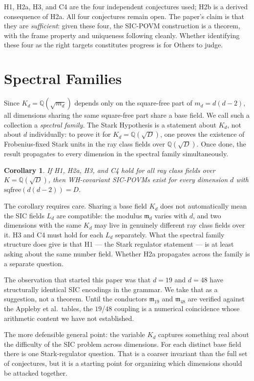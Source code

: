 \documentclass[12pt]{article}
\theoremstyle{plain}
\newtheorem{corollaryinner}[theoreminner]{Corollary}
\theoremstyle{definition}
\theoremstyle{remark}
\newenvironment{corollary}{\begin{mdframed}[style=thmstyle]\begin{corollaryinner}}{\end{corollaryinner}\end{mdframed}}
\newcommand{\bQ}{\mathbb{Q}}
\begin{document}
H1, H2a, H3, and C4 are the four independent conjectures used; H2b is a derived consequence of H2a. All four conjectures remain open. The paper's claim is that they are \emph{sufficient}: given these four, the SIC-POVM construction is a theorem, with the frame property and uniqueness following cleanly. Whether identifying these four as the right targets constitutes progress is for Others to judge.

\section{Spectral Families}
\label{sec:families}

Since $K_d = \bQ(\sqrt{m_d})$ depends only on the square-free part of $m_d = d(d-2)$, all dimensions sharing the same square-free part share a base field. We call such a collection a \emph{spectral family}. The Stark Hypothesis is a statement about $K_d$, not about $d$ individually: to prove it for $K_d = \bQ(\sqrt{D})$, one proves the existence of Frobenius-fixed Stark units in the ray class fields over $\bQ(\sqrt{D})$. Once done, the result propagates to every dimension in the spectral family simultaneously.

\begin{corollary}
  \label{cor:spectral}
  If H1, H2a, H3, and C4 hold for all ray class fields over $K = \bQ(\sqrt{D})$, then WH-covariant SIC-POVMs exist for every dimension $d$ with $\mathrm{sqfree}(d(d-2)) = D$.
\end{corollary}

The corollary requires care. Sharing a base field $K_d$ does not automatically mean the SIC fields $L_d$ are compatible: the modulus $\mathfrak{m}_d$ varies with $d$, and two dimensions with the same $K_d$ may live in genuinely different ray class fields over it. H3 and C4 must hold for each $L_d$ separately. What the spectral family structure does give is that H1 — the Stark regulator statement — is at least asking about the same number field. Whether H2a propagates across the family is a separate question.

The observation that started this paper was that $d = 19$ and $d = 48$ have structurally identical SIC encodings in the grammar. We take that as a suggestion, not a theorem. Until the conductors $\mathfrak{m}_{19}$ and $\mathfrak{m}_{48}$ are verified against the Appleby et al.\ tables, the $19$/$48$ coupling is a numerical coincidence whose arithmetic content we have not established.

The more defensible general point: the variable $K_d$ captures something real about the difficulty of the SIC problem across dimensions. For each distinct base field there is one Stark-regulator question. That is a coarser invariant than the full set of conjectures, but it is a starting point for organizing which dimensions should be attacked together.
\end{document}
